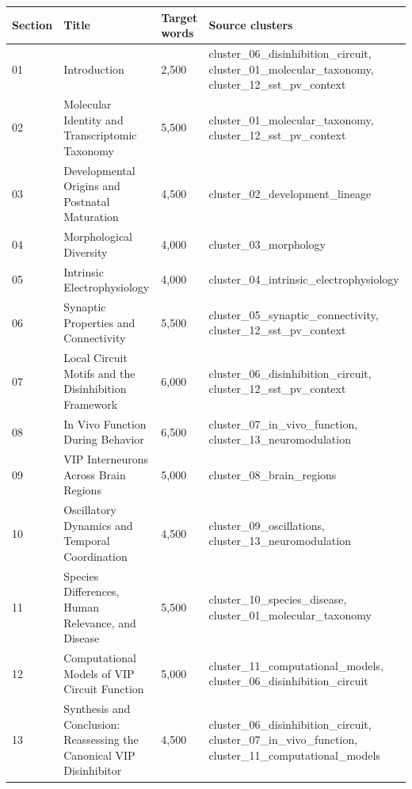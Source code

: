 \documentclass[11pt]{article}
\begin{document}
\bigskip\noindent
\begin{tabular}{p{}p{}p{}p{}}
\toprule
Section & Title & Target words & Source clusters \\
\hline
01 & Introduction & 2,500 & cluster\_06\_disinhibition\_circuit, cluster\_01\_molecular\_taxonomy, cluster\_12\_sst\_pv\_context \\
02 & Molecular Identity and Transcriptomic Taxonomy & 5,500 & cluster\_01\_molecular\_taxonomy, cluster\_12\_sst\_pv\_context \\
03 & Developmental Origins and Postnatal Maturation & 4,500 & cluster\_02\_development\_lineage \\
04 & Morphological Diversity & 4,000 & cluster\_03\_morphology \\
05 & Intrinsic Electrophysiology & 4,000 & cluster\_04\_intrinsic\_electrophysiology \\
06 & Synaptic Properties and Connectivity & 5,500 & cluster\_05\_synaptic\_connectivity, cluster\_12\_sst\_pv\_context \\
07 & Local Circuit Motifs and the Disinhibition Framework & 6,000 & cluster\_06\_disinhibition\_circuit, cluster\_12\_sst\_pv\_context \\
08 & In Vivo Function During Behavior & 6,500 & cluster\_07\_in\_vivo\_function, cluster\_13\_neuromodulation \\
09 & VIP Interneurons Across Brain Regions & 5,000 & cluster\_08\_brain\_regions \\
10 & Oscillatory Dynamics and Temporal Coordination & 4,500 & cluster\_09\_oscillations, cluster\_13\_neuromodulation \\
11 & Species Differences, Human Relevance, and Disease & 5,500 & cluster\_10\_species\_disease, cluster\_01\_molecular\_taxonomy \\
12 & Computational Models of VIP Circuit Function & 5,000 & cluster\_11\_computational\_models, cluster\_06\_disinhibition\_circuit \\
13 & Synthesis and Conclusion: Reassessing the Canonical VIP Disinhibitor & 4,500 & cluster\_06\_disinhibition\_circuit, cluster\_07\_in\_vivo\_function, cluster\_11\_computational\_models \\
\bottomrule
\end{tabular}

\bigskip
\end{document}
